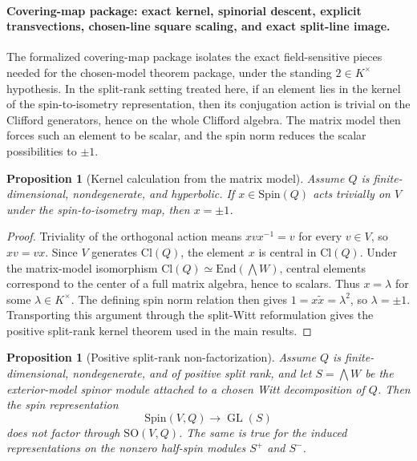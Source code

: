 \documentclass[11pt,a4paper]{article}
\theoremstyle{plain}
\newtheorem{proposition}[theorem]{Proposition}
\theoremstyle{definition}
\theoremstyle{remark}
\newcommand{\Cl}{\mathrm{Cl}}
\newcommand{\Spin}{\mathrm{Spin}}
\newcommand{\SO}{\mathrm{SO}}
\newcommand{\End}{\mathrm{End}}
\begin{document}
\paragraph{Covering-map package: exact kernel, spinorial descent, explicit transvections, chosen-line square scaling, and exact split-line image.}
The formalized covering-map package isolates the exact field-sensitive pieces
needed for the chosen-model theorem package, under the standing
$2\in K^\times$ hypothesis. In the split-rank setting treated here, if an
element lies in the kernel of the spin-to-isometry representation, then its
conjugation action is trivial on the Clifford generators, hence on the whole
Clifford algebra. The matrix model then forces such an element to be scalar,
and the spin norm reduces the scalar possibilities to $\pm1$.

\begin{proposition}[Kernel calculation from the matrix model]
\label{prop:kernel-from-matrix}
Assume $Q$ is finite-dimensional, nondegenerate, and hyperbolic. If
$x\in \Spin(Q)$ acts trivially on $V$ under the spin-to-isometry map, then
$x=\pm1$.
\end{proposition}

\begin{proof}
Triviality of the orthogonal action means $xvx^{-1}=v$ for every $v\in V$, so
$xv=vx$. Since $V$ generates $\Cl(Q)$, the element $x$ is central in
$\Cl(Q)$. Under the matrix-model isomorphism
$\Cl(Q)\simeq \End(\bigwedge W)$, central elements correspond to the center of a
full matrix algebra, hence to scalars. Thus $x=\lambda$ for some
$\lambda\in K^\times$. The defining spin norm relation then gives
$1=x\tilde x=\lambda^2$, so $\lambda=\pm1$. Transporting this argument through
the split-Witt reformulation gives the positive split-rank kernel theorem used in the
main results.
\end{proof}

\begin{proposition}[Positive split-rank non-factorization]
\label{prop:nonfactorization}
Assume $Q$ is finite-dimensional, nondegenerate, and of positive split rank,
and let $S=\bigwedge W$ be the exterior-model spinor module attached to a
chosen Witt decomposition of $Q$. Then the spin representation
\[
  \Spin(V,Q)\to \operatorname{GL}(S)
\]
does not factor through $\SO(V,Q)$. The same is true for the induced
representations on the nonzero half-spin modules $S^+$ and $S^-$.
\end{proposition}
\end{document}
